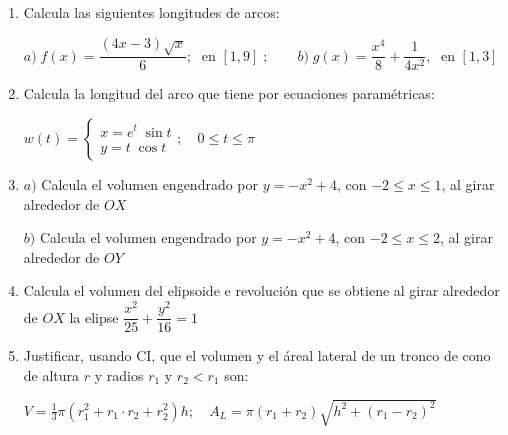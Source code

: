 \begin{enumerate}
\rightline{\textcolor{gris}{Sol: $\; (e-\frac 1 e) \; u$}}


\item Calcula las siguientes longitudes de arcos:

$a)\; f(x)=\dfrac {(4x-3)\sqrt{x}}{6}; \; \text { en } [1,9]\; ; \qquad b)\; g(x)=\dfrac {x^4}{8} + \dfrac {1}{4x^2}, \; \text { en } [1,3]$

\item Calcula la longitud del arco que tiene por ecuaciones paramétricas:

$w(t)=\begin{cases} x=e^t\;  \sin t \\ y= t\;  \cos t \end{cases}; \quad 0\le t \le \pi $


\item $a)$ Calcula el volumen engendrado por $y=-x^2+4$, con $-2\le x \le 1$, al girar alrededor de $OX$

$b)$ Calcula el volumen engendrado por $y=-x^2+4$, con $-2\le x \le 2$, al girar alrededor de $OY$

\rightline{\textcolor{gris}{Sol: $\;a)\; 30.6 \; \pi \; u^3; \quad b)\; 16\; \pi\; u^3$}}

\item Calcula el volumen del elipsoide e revolución que se obtiene al girar alrededor de $OX$ la elipse $\dfrac{x^2}{25}+\dfrac{y^2}{16}=1$




\item Justificar, usando CI,  que el volumen y el áreal lateral de un tronco de cono de altura $r$ y radios $r_1$ y $r_2<r_1$ son:

\hspace{15mm} $V=\frac 1 3 \pi (r_1^2+r_1 \cdot r_2+r_2^2)h; \quad A_L=\pi (r_1+r_2) \sqrt{h^2+(r_1-r_2)^2}$



\end{enumerate}

